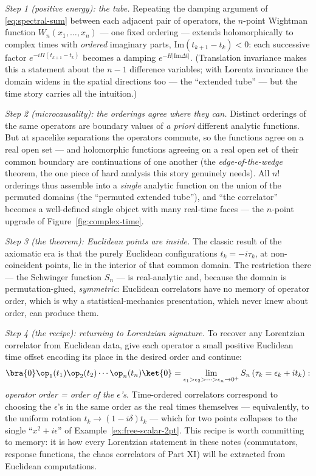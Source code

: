 \emph{Step 1 (positive energy): the tube.} Repeating the damping argument of
\eqref{eq:spectral-sum} between each adjacent pair of operators, the
$n$-point Wightman function $W_n(x_1, \dots, x_n)$ --- one fixed ordering ---
extends holomorphically to complex times with \emph{ordered} imaginary parts,
$\mathrm{Im}(t_{k+1} - t_k) < 0$: each successive factor $e^{-iH(t_{k+1} -
t_k)}$ becomes a damping $e^{-H|\mathrm{Im}\Delta t|}$. (Translation
invariance makes this a statement about the $n-1$ difference variables; with
Lorentz invariance the domain widens in the spatial directions too --- the
``extended tube'' --- but the time story carries all the intuition.)

\emph{Step 2 (microcausality): the orderings agree where they can.} Distinct
orderings of the same operators are boundary values of \emph{a priori}
different analytic functions. But at spacelike separations the operators
commute, so the functions agree on a real open set --- and holomorphic
functions agreeing on a real open set of their common boundary are
continuations of one another (the \emph{edge-of-the-wedge} theorem, the one
piece of hard analysis this story genuinely needs). All $n!$ orderings thus
assemble into a
\emph{single} analytic function on the union of the permuted domains (the
``permuted extended tube''), and ``the correlator'' becomes a well-defined
single object with many real-time faces --- the $n$-point upgrade of
Figure~\ref{fig:complex-time}.

\emph{Step 3 (the theorem): Euclidean points are inside.} The classic result
of the axiomatic era is that the purely Euclidean configurations $t_k =
-i\tau_k$, at non-coincident points, lie in the interior of that common
domain. The restriction there --- the Schwinger function $S_n$ --- is
real-analytic and, because the domain is permutation-glued,
\emph{symmetric}: Euclidean correlators have no memory of operator order,
which is why a statistical-mechanics presentation, which never knew about
order, can produce them.

\emph{Step 4 (the recipe): returning to Lorentzian signature.} To recover any Lorentzian
correlator from Euclidean data, give each operator a small positive Euclidean
time offset encoding its place in the desired order and continue:
\begin{equation}
\bra{0}\op_1(t_1)\op_2(t_2)\cdots\op_n(t_n)\ket{0}
=
\lim_{\epsilon_1 > \epsilon_2 > \cdots > \epsilon_n \to 0^+}
S_n\left(\tau_k = \epsilon_k + i t_k\right):
\label{eq:continuation-recipe}
\end{equation}
\emph{operator order = order of the $\epsilon$'s}. Time-ordered correlators
correspond to choosing the $\epsilon$'s in the same order as the real times
themselves --- equivalently, to the uniform rotation $t_k \to (1 -
i\delta)t_k$ --- which for two points collapses to the single ``$x^2 +
i\epsilon$'' of Example~\ref{ex:free-scalar-2pt}. This recipe
is worth committing to memory: it is how every Lorentzian statement in these
notes (commutators, response functions, the chaos correlators of Part XI)
will be extracted from Euclidean computations.


